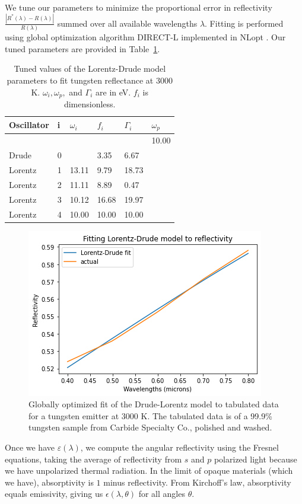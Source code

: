 \documentclass[%
 reprint,
 amsmath,amssymb,
 aps
]{revtex4-2}
\begin{document}
We tune our parameters to minimize the proportional error in reflectivity $\frac{|R^*(\lambda) - R(\lambda)|}{R(\lambda)}$ summed over all available wavelengths $\lambda$. Fitting is performed using global optimization algorithm DIRECT-L implemented in NLopt \cite{nlopt, direct-l}. Our tuned parameters are provided in Table~\ref{Tab:Tcr}. 

\begin{table}[ht]
\caption{Tuned values of the Lorentz-Drude model parameters to fit tungsten reflectance at 3000 K. $\omega_i, \omega_p,$ and $\Gamma_i$ are in eV. $f_i$ is dimensionless.}
\centering
  \begin{tabular}{l l l l l l}
    Oscillator  & i & $\omega_i$ & $f_i$ & $\Gamma_i$ &$\omega_p$\\
    \hline
     & & & & & 10.00\\
    Drude      & 0 & & 3.35 &  6.67  &            \\
    Lorentz      & 1 & 13.11& 9.79&   18.73 &            \\
    Lorentz        & 2& 11.11& 8.89 &  0.47 &          \\
    Lorentz        & 3& 10.12& 16.68 &  19.97  &          \\
    Lorentz        & 4& 10.00& 10.00 &  10.00 &           \\
  \end{tabular}
  \label{Tab:Tcr}
\end{table}

\begin{figure}
\includegraphics[width=.9\linewidth]{LD.PNG}

\caption{Globally optimized fit of the Drude-Lorentz model to tabulated data for a tungsten emitter at 3000 K. The tabulated data is of a 99.9\% tungsten sample from Carbide Specialty Co., polished and washed.}
\end{figure}
Once we have $\varepsilon(\lambda)$, we compute the angular reflectivity using the Fresnel equations, taking the average of reflectivity from $s$ and $p$ polarized light because we have unpolarized thermal radiation. In the limit of opaque materials (which we have), absorptivity is $1$ minus reflectivity. From Kirchoff's law, absorptivity equals emissivity, giving us $\epsilon(\lambda,\theta)$ for all angles $\theta$. 
\end{document}
